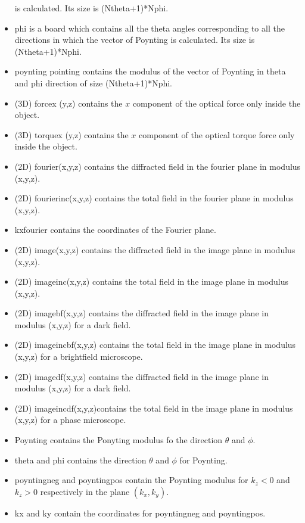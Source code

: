 \begin{itemize}
  is calculated. Its size is (Ntheta+1)*Nphi.
\item phi is a board which contains all the theta angles corresponding
  to all the directions in which the vector of Poynting is
  calculated. Its size is (Ntheta+1)*Nphi.
\item poynting pointing contains the modulus of the vector of Poynting
  in theta and phi direction of size (Ntheta+1)*Nphi.
\item (3D) forcex (y,z) contains the  $x$ component of the optical force
  only inside the object.
\item (3D) torquex (y,z) contains the $x$ component of the optical
  torque force only inside the object.
\item (2D) fourier(x,y,z) contains the diffracted field in the fourier
  plane in modulus (x,y,z).
\item (2D) fourierinc(x,y,z) contains the total field in the fourier
  plane in modulus (x,y,z).
\item kxfourier contains the coordinates of the Fourier plane.
\item (2D) image(x,y,z) contains the diffracted field in the image
  plane in modulus (x,y,z).
\item (2D) imageinc(x,y,z) contains the total field in the image plane
  in modulus (x,y,z).
\item (2D) imagebf(x,y,z) contains the diffracted field in the image
  plane in modulus (x,y,z) for a dark field.
\item (2D) imageincbf(x,y,z) contains the total field in the image
  plane in modulus (x,y,z) for a brightfield microscope.
\item (2D) imagedf(x,y,z) contains the diffracted field in the image
  plane in modulus (x,y,z) for a dark field.
\item (2D) imageincdf(x,y,z)contains the total field in the image
  plane in modulus (x,y,z) for a phase microscope.
\item Poynting contains the Ponyting modulus fo the direction $\theta$
  and $\phi$.
\item theta and phi contains the direction $\theta$ and $\phi$ for
  Poynting.
\item poyntingneg and poyntingpos contain the Poynting modulus for
  $k_z<0$ and $k_z>0$ respectively in the plane $(k_x,k_y)$.
\item kx and ky contain the coordinates for poyntingneg and
  poyntingpos.
\end{itemize}

